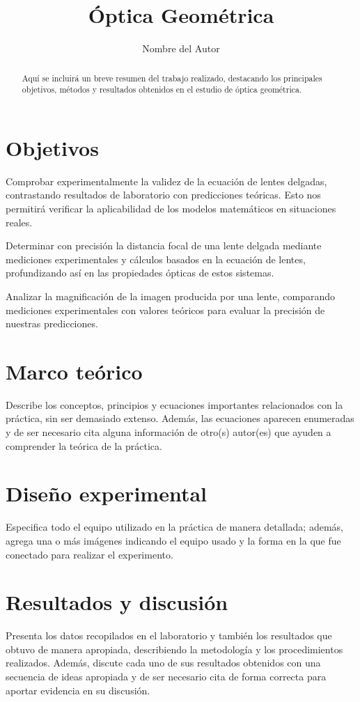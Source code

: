 \documentclass[twocolumn,a4paper,11pt]{scrartcl}
\title{Óptica Geométrica}
\author{Nombre del Autor}
\date{}
\begin{document}
\maketitle

\begin{abstract}
Aquí se incluirá un breve resumen del trabajo realizado, destacando los principales objetivos, métodos y resultados obtenidos en el estudio de óptica geométrica.
\end{abstract}

\section{Objetivos}

Comprobar experimentalmente la validez de la ecuación de lentes delgadas, contrastando resultados de laboratorio con predicciones teóricas. Esto nos permitirá verificar la aplicabilidad de los modelos matemáticos en situaciones reales.

Determinar con precisión la distancia focal de una lente delgada mediante mediciones experimentales y cálculos basados en la ecuación de lentes, profundizando así en las propiedades ópticas de estos sistemas.

Analizar la magnificación de la imagen producida por una lente, comparando mediciones experimentales con valores teóricos para evaluar la precisión de nuestras predicciones.


\section{Marco teórico}
Describe los conceptos, principios y ecuaciones importantes relacionados con la práctica, sin ser demasiado extenso. Además, las ecuaciones aparecen enumeradas y de ser necesario cita alguna información de otro(s) autor(es) que ayuden a comprender la teórica de la práctica.

\section{Diseño experimental}
Especifica todo el equipo utilizado en la práctica de manera detallada; además, agrega una o más imágenes indicando el equipo usado y la forma en la que fue conectado para realizar el experimento.

\section{Resultados y discusión}
Presenta los datos recopilados en el laboratorio y también los resultados que obtuvo de manera apropiada, describiendo la metodología y los procedimientos realizados. Además, discute cada uno de sus resultados obtenidos con una secuencia de ideas apropiada y de ser necesario cita de forma correcta para aportar evidencia en su discusión.
\end{document}
